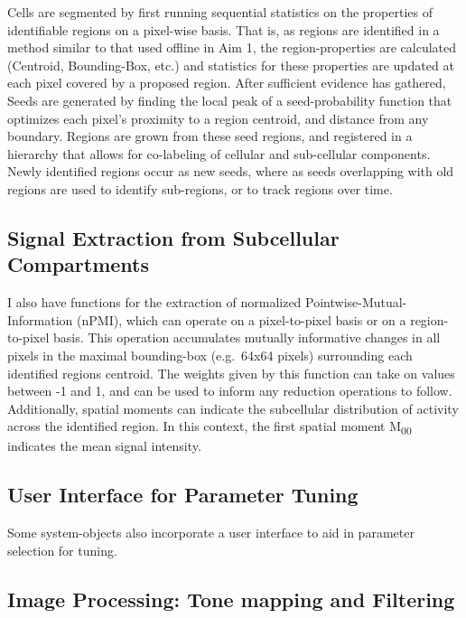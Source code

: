 \documentclass[../main.tex]{subfiles}
\begin{document}
Cells are segmented by first running sequential statistics on the properties of identifiable regions on a pixel-wise basis.
That is, as regions are identified in a method similar to that used offline in Aim 1, the region-properties are calculated (Centroid, Bounding-Box, etc.)
and statistics for these properties are updated at each pixel covered by
a proposed region.
After sufficient evidence has gathered, Seeds are generated by finding the local peak of a seed-probability function that optimizes each pixel's proximity to a region centroid, and distance from any boundary.
Regions are grown from these seed regions, and registered in a hierarchy that allows for co-labeling of cellular and sub-cellular components.
Newly identified regions occur as new seeds, where as seeds overlapping with old regions are used to identify sub-regions, or to track regions over time.

\subsection{
	Signal Extraction from Subcellular Compartments}\label{signal-extraction-from-subcellular-compartments}

I also have functions for the extraction of normalized Pointwise-Mutual-Information (nPMI), which can operate on a pixel-to-pixel basis or on a region-to-pixel basis.
This operation accumulates mutually informative changes in all pixels in the maximal bounding-box (e.g.~64x64 pixels) surrounding each identified regions centroid.
The weights given by this function can take on values between -1 and 1, and can be used to inform any reduction operations to follow.
Additionally, spatial moments can indicate the subcellular distribution of activity across the identified region.
In this context, the first spatial moment M\textsubscript{00} indicates the mean signal intensity.

\subsection{
	User Interface for Parameter Tuning}\label{user-interface-for-parameter-tuning}

Some system-objects also incorporate a user interface to aid in parameter selection for tuning.

\subsection{Image Processing: Tone mapping and
	Filtering}\label{image-processing-tonemapping-and-filtering}
\end{document}
